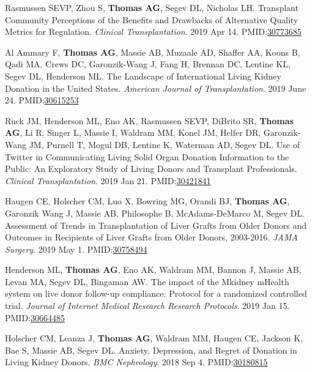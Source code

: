 \documentclass[10pt]{article}
\makeatletter
\newlength{\bibhang}
\newlength{\bibsep}
 {\@listi \global\bibsep\itemsep \global\advance\bibsep by\parsep}
\newenvironment{bibenum*}
  {\renewcommand\labelenumi{[\theenumi]}%
   \etaremune[
     topsep=0pt,
     itemsep=\bibsep,
     parsep=0pt,partopsep=0pt,
     itemindent=-\bibhang,
     leftmargin={\bibhang+\widthof{[999]}}]}
  {\endetaremune}
\newcommand{\pmid}[1]{PMID:\href{https://www.ncbi.nlm.nih.gov/pubmed/#1}{#1}}
\makeatother
\begin{document}
\begin{bibenum*}
\item Rasmussen SEVP, Zhou S, \textbf{Thomas AG},
  Segev DL, Nicholas LH.
  Transplant Community Perceptions of the Benefits and Drawbacks of
  Alternative Quality Metrics for Regulation.
  \emph{Clinical Transplantation}. 2019 Apr 14.
  \pmid{30773685} 

\item Al Ammary F\dag, \textbf{Thomas AG\dag}, Massie AB, Muzaale AD,
  Shaffer AA, Koons B, Qadi MA, Crews DC, Garonzik-Wang J,
  Fang H, Brennan DC, Lentine KL, Segev DL, Henderson ML.
  The Landscape of International Living Kidney Donation in the United States.
  \emph{American Journal of Transplantation}. 2019 June 24.
  \pmid{30615253} 

\item Ruck JM\dag, Henderson ML\dag, Eno AK, Rasmussen SEVP,
  DiBrito SR, \textbf{Thomas AG}, Li R, Singer L, Massie I, Waldram MM,
  Konel JM, Helfer DR, Garonzik-Wang JM, Purnell T,
  Mogul DB, Lentine K, Waterman AD, Segev DL.
  Use of Twitter in Communicating Living Solid Organ Donation Information
  to the Public: An Exploratory Study of Living Donors and
  Transplant Professionals.
  \emph{Clinical Transplantation}. 2019 Jan 21.
  \pmid{30421841} 

\item Haugen CE, Holscher CM, Luo X, Bowring MG, Orandi BJ, \textbf{Thomas AG},
  Garonzik Wang J, Massie AB, Philosophe B, McAdams-DeMarco M, Segev DL.
  Assessment of Trends in Transplantation of Liver Grafts from Older Donors
  and Outcomes in Recipients of Liver Grafts from Older Donors, 2003-2016.
  \emph{JAMA Surgery}. 2019 May 1.
  \pmid{30758494} 

\item Henderson ML, \textbf{Thomas AG}, Eno AK, Waldram MM, Bannon J,
  Massie AB, Levan MA, Segev DL, Bingaman AW.
  The impact of the Mkidney mHealth system on live donor
  follow-up compliance: Protocol for a randomized controlled trial.
  \emph{Journal of Internet Medical Research Research Protocols}. 2019 Jan 15.
  \pmid{30664485} 

\item Holscher CM, Leanza J, \textbf{Thomas AG}, Waldram MM, Haugen CE,
  Jackson K, Bae S, Massie AB, Segev DL. 
  Anxiety, Depression, and
  Regret of Donation in Living Kidney Donors.
  \emph{BMC Nephrology}. 2018 Sep 4.
  \pmid{30180815} 


\end{bibenum*}
\end{document}
